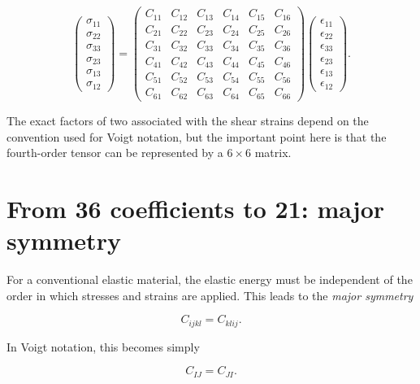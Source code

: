 \documentclass[11pt]{article}
\begin{document}
\begin{equation}
\begin{pmatrix}
\sigma_{11}\\
\sigma_{22}\\
\sigma_{33}\\
\sigma_{23}\\
\sigma_{13}\\
\sigma_{12}
\end{pmatrix}
=
\begin{pmatrix}
C_{11}&C_{12}&C_{13}&C_{14}&C_{15}&C_{16}\\
C_{21}&C_{22}&C_{23}&C_{24}&C_{25}&C_{26}\\
C_{31}&C_{32}&C_{33}&C_{34}&C_{35}&C_{36}\\
C_{41}&C_{42}&C_{43}&C_{44}&C_{45}&C_{46}\\
C_{51}&C_{52}&C_{53}&C_{54}&C_{55}&C_{56}\\
C_{61}&C_{62}&C_{63}&C_{64}&C_{65}&C_{66}
\end{pmatrix}
\begin{pmatrix}
\epsilon_{11}\\
\epsilon_{22}\\
\epsilon_{33}\\
\epsilon_{23}\\
\epsilon_{13}\\
\epsilon_{12}
\end{pmatrix}.
\end{equation}

The exact factors of two associated with the shear strains depend on the convention used for Voigt notation, but the important point here is that the fourth-order tensor can be represented by a $6\times6$ matrix.

\section{From 36 coefficients to 21: major symmetry}

For a conventional elastic material, the elastic energy must be independent of the order in which stresses and strains are applied. This leads to the \emph{major symmetry}

\begin{equation}
    C_{ijkl} = C_{klij}.
\end{equation}

In Voigt notation, this becomes simply

\begin{equation}
    C_{IJ} = C_{JI}.
\end{equation}
\end{document}
